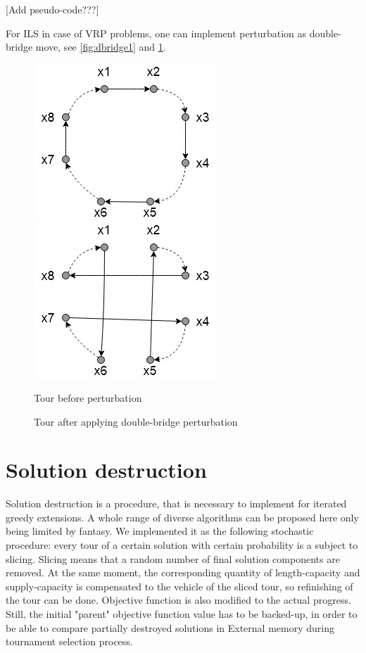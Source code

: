 \documentclass[11pt,a4paper,oneside]{book}
\begin{document}
[Add pseudo-code???]

For ILS in case of VRP problems, one can implement perturbation as double-bridge move, see \ref{fig:dbridge1} and \ref{fig:dbridge2}.


\begin{multicols}{2}
\begin{figure}[ht!]
\includegraphics[width=.3\textwidth]{double-bridge/1.jpg}\hfill
\includegraphics[width=.3\textwidth]{double-bridge/2.jpg}
\caption{Tour before perturbation} \label{fig:dbridge1}
\caption{Tour after applying double-bridge perturbation} \label{fig:dbridge2}
\end{figure}
\end{multicols}


\section{Solution destruction}

Solution destruction is a procedure, that is necessary to implement for iterated greedy extensions. A whole range of diverse algorithms can be proposed here only being limited by fantasy. We implemented it as the following stochastic procedure: every tour of a certain solution with certain probability is a subject to slicing. Slicing means that a random number of final solution components are removed. At the same moment, the corresponding quantity of length-capacity and supply-capacity is compensated to the vehicle of the sliced tour, so refinishing of the tour can be done. Objective function is also modified to the actual progress. Still, the initial "parent" objective function value has to be backed-up, in order to be able to compare partially destroyed solutions in External memory during tournament selection process.
\end{document}
